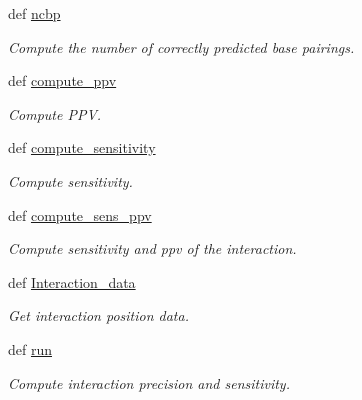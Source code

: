 \begin{DoxyCompactItemize}
def \hyperlink{classirna_1_1iRNA__stat_1_1Interaction_1_1Interaction_a4059defbd28ee584d52ccae751661ea4}{ncbp}
\begin{DoxyCompactList}\small\item\em \-Compute the number of correctly predicted base pairings. \end{DoxyCompactList}\item 
def \hyperlink{classirna_1_1iRNA__stat_1_1Interaction_1_1Interaction_a32a46e587a399b3b95ead87e4dc39de7}{compute\-\_\-ppv}
\begin{DoxyCompactList}\small\item\em \-Compute \-P\-P\-V. \end{DoxyCompactList}\item 
def \hyperlink{classirna_1_1iRNA__stat_1_1Interaction_1_1Interaction_afc93fd739e3ce952a0ccf3384dce5e0a}{compute\-\_\-sensitivity}
\begin{DoxyCompactList}\small\item\em \-Compute sensitivity. \end{DoxyCompactList}\item 
def \hyperlink{classirna_1_1iRNA__stat_1_1Interaction_1_1Interaction_a8bf9ce9330b8a1bde5395979aeeb2941}{compute\-\_\-sens\-\_\-ppv}
\begin{DoxyCompactList}\small\item\em \-Compute sensitivity and ppv of the interaction. \end{DoxyCompactList}\item 
def \hyperlink{classirna_1_1iRNA__stat_1_1Interaction_1_1Interaction_a603c2e8a1b8612c63d09781a48bbb7d5}{\-Interaction\-\_\-data}
\begin{DoxyCompactList}\small\item\em \-Get interaction position data. \end{DoxyCompactList}\item 
def \hyperlink{classirna_1_1iRNA__stat_1_1Interaction_1_1Interaction_a799050d6c551c758f816b37b48c9fd3e}{run}
\begin{DoxyCompactList}\small\item\em \-Compute interaction precision and sensitivity. \end{DoxyCompactList}\end{DoxyCompactItemize}
